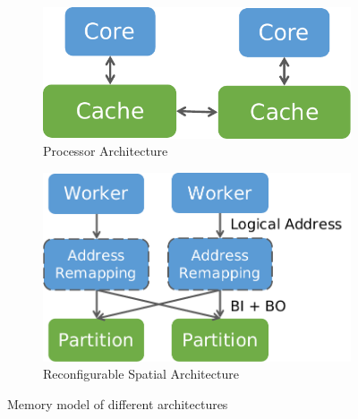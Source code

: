 \begin{figure}
  \begin{subfigure}[b]{0.35\textwidth}
  \centering
  \includegraphics[width=1\columnwidth]{figs/cpumemmodel.pdf}
  \caption{Processor Architecture}
  \end{subfigure}
  \hfill
  \begin{subfigure}[b]{0.45\textwidth}
  \centering
  \includegraphics[width=1\columnwidth]{figs/spatialmemmodel.pdf}
  \caption{Reconfigurable Spatial Architecture}
  \end{subfigure}
  \caption[Memory model of different architectures]{Memory model of different architectures}
  \label{fig:memmodel}
\end{figure}
